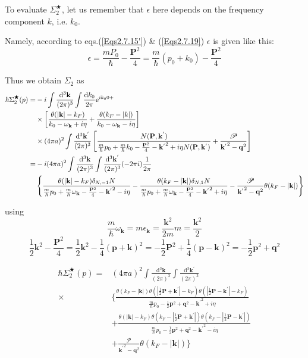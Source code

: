 To evaluate $\Sigma_2^{\bigstar}$, let us remember that $\epsilon$ here depends on the frequency component $k$, i.e. $k_0$.

Namely, according to eqs.(\ref{Eqs2.7.15'}) \& (\ref{Eqs2.7.19}) $\epsilon$ is given like this:
\[ \epsilon = \frac{m P_0}{\hbar} - \frac{\mathbf{P}^2}{4} = \frac{m}{\hbar}(p_0+k_0)-\frac{\mathbf{P}^2}{4}\]

Thus we obtain $\Sigma_2$ as
\[ \allowdisplaybreaks \begin{split}
\hbar\Sigma_2^{\bigstar}(p)=&-i \int \frac{\mathrm{d}^3\mathbf{k}}{(2\pi)^3} \int \frac{\mathrm{d}k_0}{2\pi}\mathrm{e}^{i k_0 0 +}\\
& \times \left[ \frac{\theta(|\mathbf{k}|-k_F)}{k_0-\omega_{\mathbf{k}} +i \eta} + \frac{\theta(k_F-|k|)}{k_0-\omega_{\mathbf{k}}-i \eta} \right]\\
&\times (4\pi a)^2 \int \frac{\mathrm{d}^3 \mathbf{k}^{'}}{(2\pi)^3}\left[ \frac{N(\mathbf{P},\mathbf{k}^{'})}{\frac{m}{\hbar}p_0 + \frac{m}{\hbar} k_0 - \frac{\mathbf{P}^2}{4} - {\mathbf{k}^{'}}^2+i \eta N(\mathbf{P},\mathbf{k}^{'})} + \frac{\mathscr{P}}{{\mathbf{k}^{'}}^2-\mathbf{q}^2} \right]\\
=& -i (4\pi a)^2 \int \frac{\mathrm{d}^3\mathbf{k}}{(2\pi)^3}  \int \frac{\mathrm{d}^3\mathbf{k}^{'}}{(2\pi)^3} (-2\pi i) \frac{1}{2\pi}\\
&\left\{ \frac{\theta(|\mathbf{k}|-k_F)\delta_{N,-1} N}{\frac{m}{\hbar}p_0+\frac{m}{\hbar}\omega_{\mathbf{k}}-\frac{\mathbf{P}^2}{4}-{\mathbf{k}^{'}}^2-i \eta} - \frac{\theta(k_F-|\mathbf{k}|)\delta_{N,1} N}{\frac{m}{\hbar}p_0+\frac{m}{\hbar}\omega_{\mathbf{k}}-\frac{\mathbf{P}^2}{4}-{\mathbf{k}^{'}}^2+i \eta} - \frac{\mathscr{P}}{{\mathbf{k}^{'}}^2-\mathbf{q}^2}\theta(k_F-|\mathbf{k}|) \right\}
\end{split} \]

using
\[ \frac{m}{\hbar}\omega_{\mathbf{k}} = m\epsilon_{\mathbf{k}} = \frac{\mathbf{k}^2}{2m}m = \frac{\mathbf{k}^2}{2}\]
\[ \frac{1}{2}\mathbf{k}^2 - \frac{\mathbf{P}^2}{4} = \frac{1}{2}\mathbf{k}^2-\frac{1}{4}(\mathbf{p}+\mathbf{k})^2= -\frac{1}{2}\mathbf{P}^2+\frac{1}{4}(\mathbf{p}-\mathbf{k})^2 = -\frac{1}{2}\mathbf{p}^2+\mathbf{q}^2\]

\begin{equation} \label{Eqs2.7.29} \begin{split}
\hbar \Sigma_2^{\bigstar}(p)=& (4\pi a)^2 \int \frac{\mathrm{d}^3\mathbf{k}}{(2\pi)^3}  \int \frac{\mathrm{d}^3\mathbf{k}^{'}}{(2\pi)^3} \\
\times&\{ \frac{\theta(k_F-|\mathbf{k}|)\theta(|\frac{1}{2}\mathbf{P}+\mathbf{k}^{'}|-k_F)\theta(|\frac{1}{2}\mathbf{P}-\mathbf{k}^{'}|-k_F)}{\frac{m}{\hbar}p_0-\frac{1}{2}\mathbf{p}^2+\mathbf{q}^2-{\mathbf{k}^{'}}^2+i \eta}\\
&+ \frac{\theta(|\mathbf{k}|-k_F)\theta(k_F-|\frac{1}{2}\mathbf{P}+\mathbf{k}^{'}|)\theta(k_F-|\frac{1}{2}\mathbf{P}-\mathbf{k}^{'}|)}{\frac{m}{\hbar}p_0-\frac{1}{2}\mathbf{p}^2+\mathbf{q}^2-{\mathbf{k}^{'}}^2-i \eta}\\
&+\frac{\mathscr{P}}{{\mathbf{k}^{'}}^2-\mathbf{q}^2}\theta(k_F-|\mathbf{k}|) \}
\end{split} \end{equation}

